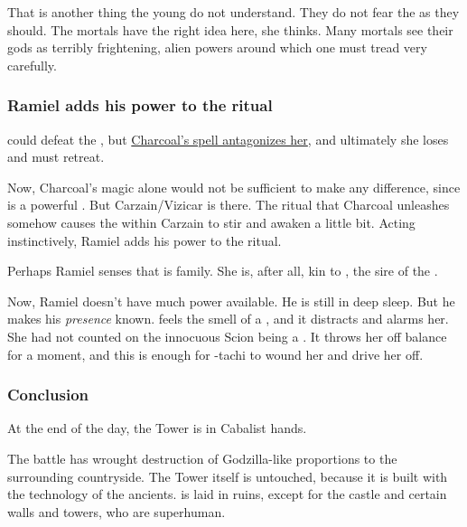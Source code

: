 \begin{garbage}
That is another thing the young \resphain{} do not understand. 
They do not fear the \banes{} as they should. 
The mortals have the right idea here, she thinks. 
Many mortals see their gods as terribly frightening, alien powers around which one must tread very carefully.

\begin{prose}
\end{prose}





\subsubsection{Ramiel adds his power to the ritual}
\Nzessuacrith{} could defeat the \resphan, but \hyperref[Charcoal at the Ghost Tower]{Charcoal's spell antagonizes her}, and ultimately she loses and must retreat.

Now, Charcoal's magic alone would not be sufficient to make any difference, since \Nzessuacrith{} is a powerful \dragon. But Carzain/Vizicar is there. The \nieur{} ritual that Charcoal unleashes somehow causes the \sathariah{} within Carzain to stir and awaken a little bit. Acting instinctively, Ramiel adds his power to the ritual. 

Perhaps Ramiel senses that \Nzessuacrith{} is family. She is, after all, kin to \Nexagglachel, the sire of the \satharioth. 

Now, Ramiel doesn't have much power available. 
He is still in deep sleep. 
But he makes his \emph{presence} known. 
\Nzessuacrith{} feels the smell of a \sathariah, and it distracts and alarms her. 
She had not counted on the innocuous Scion being a \sathariah. 
It throws her off balance for a moment, and this is enough for \Achsah-tachi to wound her and drive her off. 





\subsubsection{Conclusion}
At the end of the day, the Tower is in Cabalist hands. 

The battle has wrought destruction of Godzilla-like proportions to the surrounding countryside. The Tower itself is untouched, because it is built with the technology of the ancients. \Forklin{} is laid in ruins, except for the castle and certain walls and towers, who are superhuman. 


\end{garbage}
